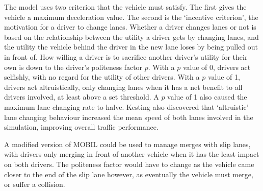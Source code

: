 The model uses two criterion that the vehicle must satisfy. The first gives the vehicle a maximum deceleration value. The second is the `incentive criterion', the motivation for a driver to change lanes. Whether a driver changes lanes or not is based on the relationship between the utility a driver gets by changing lanes, and the utility the vehicle behind the driver in the new lane loses by being pulled out in front of. How willing a driver is to sacrifice another driver's utility for their own is down to the driver's politeness factor $p$. With a $p$ value of 0, drivers act selfishly, with no regard for the utility of other drivers. With a $p$ value of 1, drivers act altruistically, only changing lanes when it has a net benefit to all drivers involved, at least above a set threshold. A $p$ value of 1 also caused the maximum lane changing rate to halve. Kesting also discovered that `altruistic' lane changing behaviour increased the mean speed of both lanes involved in the simulation, improving overall traffic performance.

A modified version of MOBIL could be used to manage merges with slip lanes, with drivers only merging in front of another vehicle when it has the least impact on both drivers. The politeness factor would have to change as the vehicle came closer to the end of the slip lane however, as eventually the vehicle must merge, or suffer a collision. 